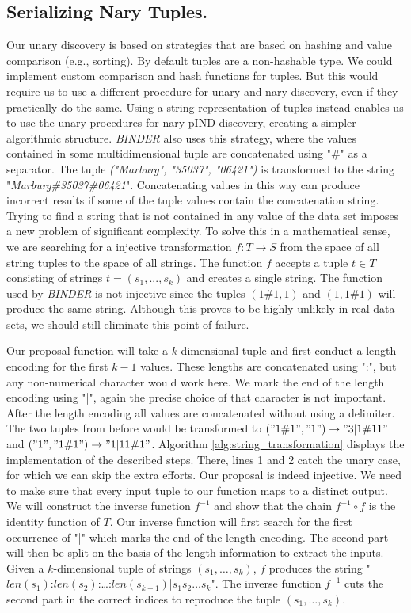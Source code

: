 \subsection{Serializing Nary Tuples.}\label{subsec:nary-strings}
Our unary discovery is based on strategies that are based on hashing and value comparison (e.g., sorting). By default tuples are a non-hashable type. We could implement custom comparison and hash functions for tuples. But this would require us to use a different procedure for unary and nary discovery, even if they practically do the same. Using a string representation of tuples instead enables us to use the unary procedures for nary pIND discovery, creating a simpler algorithmic structure. \textit{BINDER} \cite{papenbrock2015divide} also uses this strategy, where the values contained in some multidimensional tuple are concatenated using "\#" as a separator. The tuple \textit{("Marburg", "35037", "06421")} is transformed to the string "\textit{Marburg\#35037\#06421}". Concatenating values in this way can produce incorrect results if some of the tuple values contain the concatenation string. Trying to find a string that is not contained in any value of the data set imposes a new problem of significant complexity. To solve this in a mathematical sense, we are searching for a injective transformation $f: T \rightarrow S$ from the space of all string tuples to the space of all strings. The function $f$ accepts a tuple $t \in T$ consisting of strings $t = (s_1, ..., s_k)$ and creates a single string. The function used by \textit{BINDER} is not injective since the tuples $(1\#1, 1)$ and $(1, 1\#1)$ will produce the same string. Although this proves to be highly unlikely in real data sets, we should still eliminate this point of failure.

Our proposal function will take a $k$ dimensional tuple and first conduct a length encoding for the first $k-1$ values. These lengths are concatenated using ":", but any non-numerical character would work here. We mark the end of the length encoding using "|", again the precise choice of that character is not important. After the length encoding all values are concatenated without using a delimiter. The two tuples from before would be transformed to $("1\#1", "1") \rightarrow "3|1\#11"$ and $("1", "1\#1") \rightarrow "1|11\#1"$. Algorithm \ref{alg:string_transformation} displays the implementation of the described steps. There, lines 1 and 2 catch the unary case, for which we can skip the extra efforts. Our proposal is indeed injective. We need to make sure that every input tuple to our function maps to a distinct output. We will construct the inverse function $f^{-1}$ and show that the chain $f^{-1} \circ f$ is the identity function of $T$. Our inverse function will first search for the first occurrence of "|" which marks the end of the length encoding. The second part will then be split on the basis of the length information to extract the inputs.
Given a $k$-dimensional tuple of strings $(s_1, \dots, s_k)$, $f$ produces the string "$len(s_1)$:$len(s_2)$:\dots:$len(s_{k-1})$|$s_1 s_2 \dots s_k$". The inverse function $f^{-1}$ cuts the second part in the correct indices to reproduce the tuple $(s_1, \dots, s_k)$.


